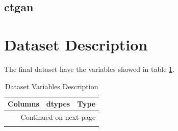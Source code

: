\documentclass{article}
\begin{document}
\subsection{ctgan}

\section{Dataset Description}

The final dataset have the variables showed in table \ref{tab:desc}.\\
\begin{longtable}{lll}
\caption{Dataset Variables Description}\label{tab:desc}\\
\toprule
                       Columns &   dtypes &         Type \\
\midrule
\endhead
\midrule
\multicolumn{3}{r}{{Continued on next page}} \\
\midrule
\endfoot


\end{longtable}
\end{document}
